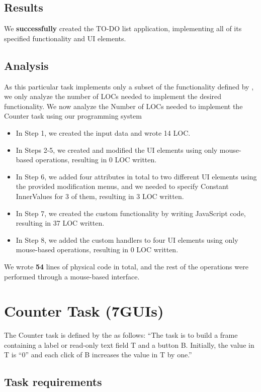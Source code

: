 \subsection{Results}
We \textbf{successfully} created the TO-DO list application, implementing all of its specified functionality and UI elements.
\medskip
\subsection{Analysis}
As this particular task implements only a subset of the functionality defined by \citet{todo-spec}, we only analyze the number of LOCs needed to implement the desired functionality.
We now analyze the Number of LOCs needed to implement the Counter task using our programming system
\begin{itemize}
	\item In Step 1, we created the input data and wrote 14 LOC.
	\item   In Steps 2-5, we created and modified the UI elements using only mouse-based operations, resulting in 0 LOC written.
	\item   In Step 6, we added four attributes in total to two different UI elements using the provided modification menus, and we needed to specify Constant InnerValues for 3 of them, resulting in 3 LOC written.
	\item   In Step 7, we created the custom functionality by writing JavaScript code, resulting in 37 LOC written.
	\item In Step 8, we added the custom handlers to four UI elements using only mouse-based operations, resulting in 0 LOC written.
\end{itemize}
\noindent We wrote \textbf{54} lines of physical code in total, and the rest of the operations were performed through a mouse-based interface.





\medskip
\section{Counter Task (7GUIs)}
The Counter task is defined by the \citet{7GUIs-web} as follows: ``The task is to build a frame containing a label or read-only text field T and a button B. Initially, the value in T is “0” and each click of B increases the value in T by one.''

\subsection{Task requirements}
